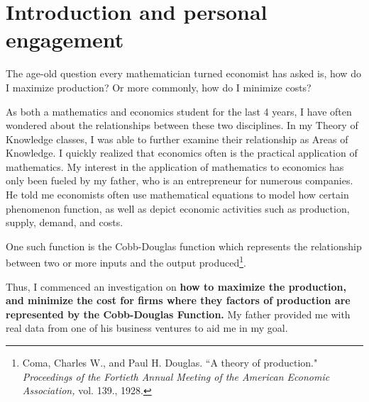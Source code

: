 \documentclass[a4paper,12pt]{article}
\theoremstyle{definition}
\begin{document}
%    
% 
%        
%
%        
%
%		
%		
% 
% 
% 
%
% 

\usetikzlibrary{positioning}

\usetikzlibrary{arrows}



\section{Introduction and personal engagement}
The age-old question every mathematician turned economist has asked is, how do I maximize production? Or more commonly, how do I minimize costs?

As both a mathematics and economics student for the last 4 years, I have often wondered about the relationships between these two disciplines. In my Theory of Knowledge classes, I was able to further examine their relationship as Areas of Knowledge. I quickly realized that economics often is the practical application of mathematics. My interest in the application of mathematics to economics has only been fueled by my father, who is an entrepreneur for numerous companies. He told me economists often use mathematical equations to model how certain phenomenon function, as well as depict  economic activities such as production, supply, demand, and costs. 

One such function is the Cobb-Douglas function which represents the relationship between two or more inputs and the output produced\footnote{Coma, Charles W., and Paul H. Douglas. ``A theory of production." \textit{Proceedings of the Fortieth Annual Meeting of the American Economic Association,} vol. 139., 1928.\label{ref:cobbd}}.

Thus, I commenced an investigation on \textbf{how to maximize the production, and minimize the cost for firms where they factors of production are represented by the Cobb-Douglas Function.} My father provided me with real data from one of his business ventures to aid me in my goal.  
\end{document}
